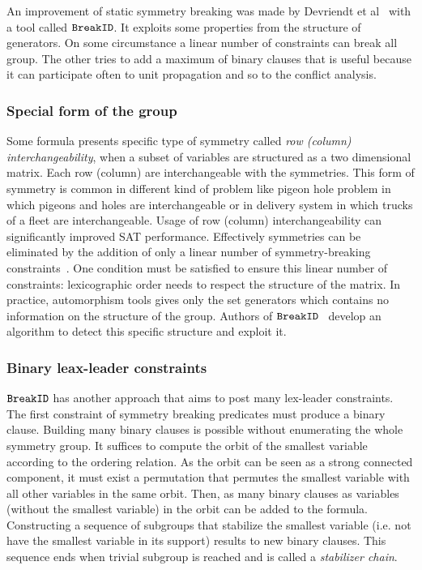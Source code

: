 An improvement of static symmetry breaking was made by Devriendt et al~\cite{devriendt2016improved} with a tool 
called $\texttt{BreakID}$. It exploits some properties from the structure of generators. On some circumstance 
a linear number of constraints can break all group. The other tries to add a maximum of binary clauses that 
is useful because it can participate often to unit propagation and so to the conflict analysis.


\subsubsection{Special form of the group} \label{sec:matrix-sbp}
Some formula presents specific type of symmetry called \emph{row (column) interchangeability}, when a
subset of variables are structured as a two dimensional matrix. Each row (column) are interchangeable
with the symmetries. 
This form of symmetry is common in different kind of problem like pigeon hole problem in which
pigeons and holes are interchangeable or in delivery system in which trucks of a fleet are interchangeable.
Usage of row (column) interchangeability can significantly improved SAT performance. 
Effectively symmetries can be eliminated by the addition 
of only a linear number of symmetry-breaking constraints~\cite{flener2002breaking}. 
One condition must be satisfied to ensure this linear number of constraints:
lexicographic order needs to respect the structure of the matrix.
In practice, automorphism tools gives only the set generators which contains no information on
the structure of the group. 
Authors of $\texttt{BreakID}$~\cite{devriendt2016improved} develop an algorithm to detect this specific 
structure and exploit it.



\subsubsection{Binary leax-leader constraints}

$\texttt{BreakID}$ has another approach that aims to post many lex-leader constraints.
The first constraint of symmetry breaking predicates must produce a binary clause.
Building many binary clauses is possible without enumerating the whole symmetry group. 
It suffices to compute the orbit of the smallest variable according to the ordering relation. As the orbit can be seen as a strong connected component, it must exist a permutation that permutes the smallest variable with all other variables in the same orbit.
Then, as many binary clauses as variables (without the smallest variable) in the orbit can be added to the formula. Constructing a sequence of subgroups that stabilize the smallest variable (i.e. not have the smallest variable in its support) results to new binary clauses.
This sequence ends when trivial subgroup is reached and is called a  \emph{stabilizer chain}.


